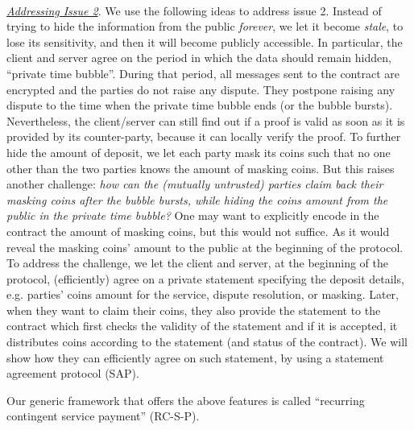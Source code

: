 \

\noindent\underline{\textit{Addressing Issue 2}}. We use the following ideas to address issue 2. Instead of trying to hide the information from the public \emph{forever}, we let it become \emph{stale}, to lose its sensitivity, and then it will become publicly accessible. In particular, the client and server agree on the period in which the data should remain hidden, ``private time bubble''. During that period, all messages sent to the contract are encrypted and the parties do not raise any dispute. They postpone raising any dispute to the time when the private time bubble ends (or the bubble bursts). Nevertheless, the client/server can still find out if a proof is valid as soon as it is provided by its counter-party, because it can locally verify the proof.  To further hide the amount of deposit, we let each party  mask its coins such that no one other than the two parties knows the amount of masking coins.  But this raises another challenge: \textit{how can the (mutually untrusted) parties claim back their masking coins after the bubble bursts, while hiding the coins amount from the public in the private time bubble?} One may want to  explicitly encode in the contract the amount of masking coins, but this would not suffice. As it would reveal the masking coins' amount to the public at the beginning of the protocol. To address the challenge, we let the client and server, at the beginning of the protocol, (efficiently)  agree on a private statement specifying the deposit details, e.g. parties' coins amount for the service, dispute resolution, or masking. Later, when they want to claim their coins, they also provide the statement to the contract which first  checks the validity of the statement and if it is accepted, it distributes coins according to the statement (and status of the contract). We will show how they can  efficiently agree on such statement, by using a statement agreement protocol (SAP).
 
 Our generic framework that offers the above features is called ``recurring contingent service payment'' (RC-S-P). 
 
 
